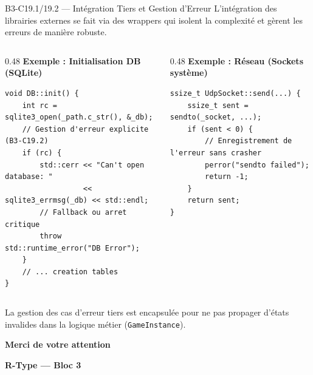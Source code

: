 \documentclass[aspectratio=169,10pt]{beamer}
\begin{document}
\begin{frame}[fragile]{B3-C19.1/19.2 — Intégration Tiers et Gestion d'Erreur}
  \footnotesize
  L'intégration des librairies externes se fait via des wrappers qui isolent la complexité et gèrent les erreurs de manière robuste.
  
  \begin{columns}[T]
  \begin{column}{0.48\textwidth}
  \textbf{Exemple : Initialisation DB (SQLite)}
  \begin{lstlisting}
void DB::init() {
    int rc = sqlite3_open(_path.c_str(), &_db);
    // Gestion d'erreur explicite (B3-C19.2)
    if (rc) {
        std::cerr << "Can't open database: " 
                  << sqlite3_errmsg(_db) << std::endl;
        // Fallback ou arret critique
        throw std::runtime_error("DB Error");
    }
    // ... creation tables
}
  \end{lstlisting}
  \end{column}
  
  \begin{column}{0.48\textwidth}
  \textbf{Exemple : Réseau (Sockets système)}
  \begin{lstlisting}
ssize_t UdpSocket::send(...) {
    ssize_t sent = sendto(_socket, ...);
    if (sent < 0) {
        // Enregistrement de l'erreur sans crasher
        perror("sendto failed");
        return -1;
    }
    return sent;
}
  \end{lstlisting}
  \end{column}
  \end{columns}
  
  \vspace{0.5em}
  La gestion des cas d'erreur tiers est encapsulée pour ne pas propager d'états invalides dans la logique métier (\texttt{GameInstance}).
\end{frame}

\begin{frame}
  \centering
  \vfill
  {\Huge \textbf{Merci de votre attention}}
  
  \vspace{1cm}
  \textbf{R-Type — Bloc 3}
  \vfill
\end{frame}
\end{document}
